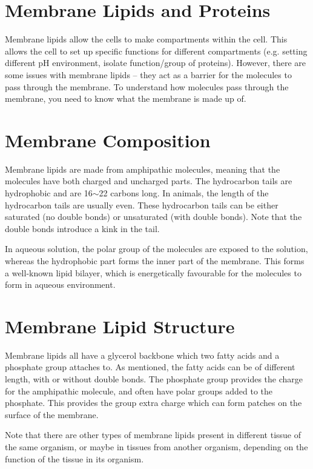 \section{Membrane Lipids and Proteins}

Membrane lipids allow the cells to make compartments within the cell.
This allows the cell to set up specific functions for different compartments (e.g. setting different pH environment, isolate function/group of proteins).
However, there are some issues with membrane lipids -- they act as a barrier for the molecules to pass through the membrane.
To understand how molecules pass through the membrane, you need to  know what the membrane is made up of.

\section{Membrane Composition}

Membrane lipids are made from amphipathic molecules, meaning that the molecules have both charged and uncharged parts.
The hydrocarbon tails are hydrophobic and are 16$\sim$22 carbons long.
In animals, the length of the hydrocarbon tails are usually even.
These hydrocarbon tails can be either saturated (no double bonds) or unsaturated (with double bonds).
Note that the double bonds introduce a kink in the tail.

In aqueous solution, the polar group of the molecules are exposed to the solution, whereas the hydrophobic part forms the inner part of the membrane.
This forms a well-known lipid bilayer, which is energetically favourable for the molecules to form in aqueous environment.

\section{Membrane Lipid Structure}

Membrane lipids all have a glycerol backbone which two fatty acids and a phosphate group attaches to.
As mentioned, the fatty acids can be of different length, with or without double bonds.
The phosphate group provides the charge for the amphipathic molecule, and often have polar groups added to the phosphate.
This provides the group extra charge which can form patches on the surface of the membrane.

Note that there are other types of membrane lipids present in different tissue of the same organism, or maybe in tissues from another organism, depending on the function of the tissue in its organism.

